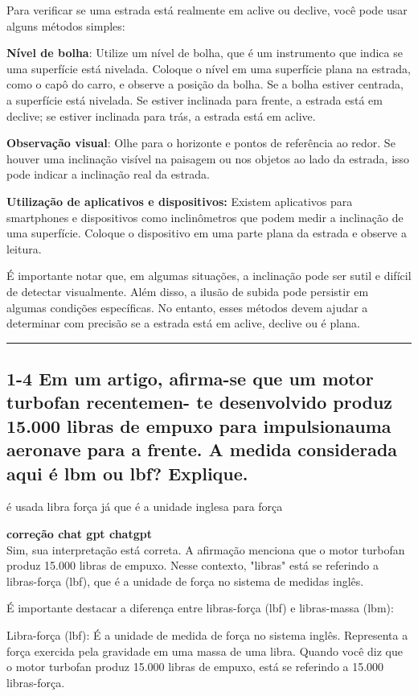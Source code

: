 \documentclass{article}
\begin{document}
Para verificar se uma estrada está realmente em aclive ou declive, você pode usar alguns métodos simples:

\textbf{Nível de bolha}: Utilize um nível de bolha, que é um instrumento que indica se uma superfície está nivelada. Coloque o nível em uma superfície plana na estrada, como o capô do carro, e observe a posição da bolha. Se a bolha estiver centrada, a superfície está nivelada. Se estiver inclinada para frente, a estrada está em declive; se estiver inclinada para trás, a estrada está em aclive.

\textbf{Observação visual}: Olhe para o horizonte e pontos de referência ao redor. Se houver uma inclinação visível na paisagem ou nos objetos ao lado da estrada, isso pode indicar a inclinação real da estrada.

\textbf{Utilização de aplicativos e dispositivos:} Existem aplicativos para smartphones e dispositivos como inclinômetros que podem medir a inclinação de uma superfície. Coloque o dispositivo em uma parte plana da estrada e observe a leitura.

É importante notar que, em algumas situações, a inclinação pode ser sutil e difícil de detectar visualmente. Além disso, a ilusão de subida pode persistir em algumas condições específicas. No entanto, esses métodos devem ajudar a determinar com precisão se a estrada está em aclive, declive ou é plana.\\

\noindent\rule{\textwidth}{0.4pt}
\subsection*{1-4 Em um artigo, afirma-se que um motor turbofan recentemen- te desenvolvido produz 15.000 libras de empuxo para impulsionauma aeronave para a frente. A medida considerada aqui é lbm ou lbf? Explique.} é usada libra força já que é a unidade inglesa para força

\textbf{correção chat gpt chatgpt}\\ Sim, sua interpretação está correta. A afirmação menciona que o motor turbofan produz 15.000 libras de empuxo. Nesse contexto, "libras" está se referindo a libras-força (lbf), que é a unidade de força no sistema de medidas inglês.

É importante destacar a diferença entre libras-força (lbf) e libras-massa (lbm):

Libra-força (lbf): É a unidade de medida de força no sistema inglês. Representa a força exercida pela gravidade em uma massa de uma libra. Quando você diz que o motor turbofan produz 15.000 libras de empuxo, está se referindo a 15.000 libras-força.
\end{document}
